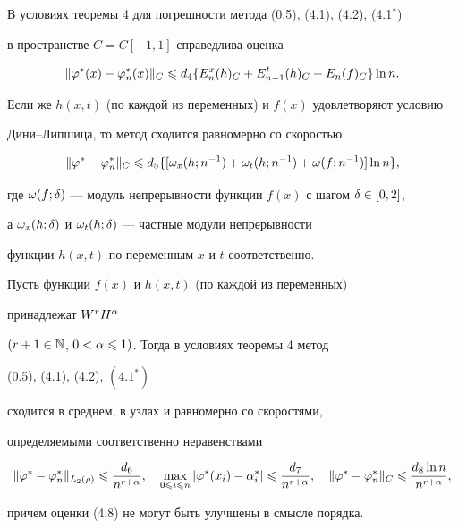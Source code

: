 \begin{cor}


В условиях теоремы 4 для погрешности метода (0.5), (4.1), (4.2), (4.1$^*$)


в пространстве $C=C[-1,1]$ справедлива оценка


\begin{equation}


\|\vp^*(x)-\vp^*_n(x)\|_C\lea d_4 \{ E_n^x(h)_C+E_{n-1}^t(h)_C+


E_n(f)_C\}\ln n.


\end{equation}


Если же $h(x,t)$ (по каждой из переменных) и $f(x)$ удовлетворяют условию


Дини--Липшица, то метод сходится равномерно со скоростью


\begin{equation}


\|\vp^*-\vp_n^*\|_C\lea d_5


\{[\omega_x(h;n^{-1})+\omega_t(h;n^{-1})+\omega(f;n^{-1})]\ln n\},


\end{equation}


где $\omega(f;\delta)$ --- модуль непрерывности функции $f(x)$ с шагом $\delta\in[0,2]$,


а $\omega_x(h;\delta)$ и $\omega_t(h;\delta)$ --- частные модули непрерывности


функции $h(x,t)$ по переменным $x$ и $t$ соответственно.


\end{cor}








\begin{cor}


Пусть функции $f(x)$ и $h(x,t)$ (по каждой из переменных)


принадлежат $W^rH^\alpha$


$(r+1\in \Bbb{N}$, $0<\alpha\leqslant 1)$. Тогда в условиях теоремы 4 метод


(0.5), (4.1), (4.2), $(4.1^*)$


сходится в среднем, в узлах и равномерно со скоростями,


определяемыми соответственно неравенствами 


\begin{equation}


\|\vp^*-\vp_n^*\|_{L_2(\rho)}\lea\frac{d_6}{n^{r+\al}},\quad


\max_{0\lea i\lea n}|\vp^*(x_i)-\al_i^*|\lea \frac{d_7}{n^{r+\alpha}},\quad


\|\vp^*-\vp_n^*\|_C\lea \frac{d_8 \ln n}{n^{r+\al}},


\end{equation}


причем оценки (4.8) не могут быть улучшены в смысле порядка.


\end{cor}





